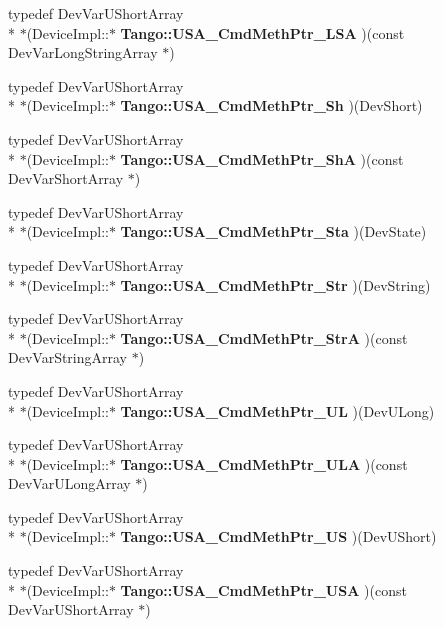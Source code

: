 \begin{DoxyCompactItemize}
typedef Dev\-Var\-U\-Short\-Array \\*
$\ast$(Device\-Impl\-::$\ast$ {\bf Tango\-::\-U\-S\-A\-\_\-\-Cmd\-Meth\-Ptr\-\_\-\-L\-S\-A} )(const Dev\-Var\-Long\-String\-Array $\ast$)
\item 
typedef Dev\-Var\-U\-Short\-Array \\*
$\ast$(Device\-Impl\-::$\ast$ {\bf Tango\-::\-U\-S\-A\-\_\-\-Cmd\-Meth\-Ptr\-\_\-\-Sh} )(Dev\-Short)
\item 
typedef Dev\-Var\-U\-Short\-Array \\*
$\ast$(Device\-Impl\-::$\ast$ {\bf Tango\-::\-U\-S\-A\-\_\-\-Cmd\-Meth\-Ptr\-\_\-\-Sh\-A} )(const Dev\-Var\-Short\-Array $\ast$)
\item 
typedef Dev\-Var\-U\-Short\-Array \\*
$\ast$(Device\-Impl\-::$\ast$ {\bf Tango\-::\-U\-S\-A\-\_\-\-Cmd\-Meth\-Ptr\-\_\-\-Sta} )(Dev\-State)
\item 
typedef Dev\-Var\-U\-Short\-Array \\*
$\ast$(Device\-Impl\-::$\ast$ {\bf Tango\-::\-U\-S\-A\-\_\-\-Cmd\-Meth\-Ptr\-\_\-\-Str} )(Dev\-String)
\item 
typedef Dev\-Var\-U\-Short\-Array \\*
$\ast$(Device\-Impl\-::$\ast$ {\bf Tango\-::\-U\-S\-A\-\_\-\-Cmd\-Meth\-Ptr\-\_\-\-Str\-A} )(const Dev\-Var\-String\-Array $\ast$)
\item 
typedef Dev\-Var\-U\-Short\-Array \\*
$\ast$(Device\-Impl\-::$\ast$ {\bf Tango\-::\-U\-S\-A\-\_\-\-Cmd\-Meth\-Ptr\-\_\-\-U\-L} )(Dev\-U\-Long)
\item 
typedef Dev\-Var\-U\-Short\-Array \\*
$\ast$(Device\-Impl\-::$\ast$ {\bf Tango\-::\-U\-S\-A\-\_\-\-Cmd\-Meth\-Ptr\-\_\-\-U\-L\-A} )(const Dev\-Var\-U\-Long\-Array $\ast$)
\item 
typedef Dev\-Var\-U\-Short\-Array \\*
$\ast$(Device\-Impl\-::$\ast$ {\bf Tango\-::\-U\-S\-A\-\_\-\-Cmd\-Meth\-Ptr\-\_\-\-U\-S} )(Dev\-U\-Short)
\item 
typedef Dev\-Var\-U\-Short\-Array \\*
$\ast$(Device\-Impl\-::$\ast$ {\bf Tango\-::\-U\-S\-A\-\_\-\-Cmd\-Meth\-Ptr\-\_\-\-U\-S\-A} )(const Dev\-Var\-U\-Short\-Array $\ast$)
\end{DoxyCompactItemize}
